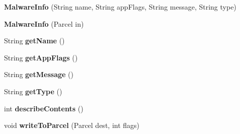 \begin{DoxyCompactItemize}
\item 
\hypertarget{classcom_1_1avira_1_1antivirusimplementation_1_1_malware_info_af6edd31deb26cc1c5a344ef0303b65dd}{}{\bfseries Malware\+Info} (String name, String app\+Flags, String message, String type)\label{classcom_1_1avira_1_1antivirusimplementation_1_1_malware_info_af6edd31deb26cc1c5a344ef0303b65dd}

\item 
\hypertarget{classcom_1_1avira_1_1antivirusimplementation_1_1_malware_info_acb2686626b6412ed2055b8b3dc4f8a12}{}{\bfseries Malware\+Info} (Parcel in)\label{classcom_1_1avira_1_1antivirusimplementation_1_1_malware_info_acb2686626b6412ed2055b8b3dc4f8a12}

\item 
\hypertarget{classcom_1_1avira_1_1antivirusimplementation_1_1_malware_info_aaea00237b4d2953ea9418ea1cae627f5}{}String {\bfseries get\+Name} ()\label{classcom_1_1avira_1_1antivirusimplementation_1_1_malware_info_aaea00237b4d2953ea9418ea1cae627f5}

\item 
\hypertarget{classcom_1_1avira_1_1antivirusimplementation_1_1_malware_info_acb9291551c3240c35c635192bd772590}{}String {\bfseries get\+App\+Flags} ()\label{classcom_1_1avira_1_1antivirusimplementation_1_1_malware_info_acb9291551c3240c35c635192bd772590}

\item 
\hypertarget{classcom_1_1avira_1_1antivirusimplementation_1_1_malware_info_a770a87cd5c333d45f26a4e1bc30a5861}{}String {\bfseries get\+Message} ()\label{classcom_1_1avira_1_1antivirusimplementation_1_1_malware_info_a770a87cd5c333d45f26a4e1bc30a5861}

\item 
\hypertarget{classcom_1_1avira_1_1antivirusimplementation_1_1_malware_info_a324dbd7f3a3985f57e3ee39fabe735e9}{}String {\bfseries get\+Type} ()\label{classcom_1_1avira_1_1antivirusimplementation_1_1_malware_info_a324dbd7f3a3985f57e3ee39fabe735e9}

\item 
\hypertarget{classcom_1_1avira_1_1antivirusimplementation_1_1_malware_info_a77e71b13d1f688d49e9d183f2cf6c166}{}int {\bfseries describe\+Contents} ()\label{classcom_1_1avira_1_1antivirusimplementation_1_1_malware_info_a77e71b13d1f688d49e9d183f2cf6c166}

\item 
\hypertarget{classcom_1_1avira_1_1antivirusimplementation_1_1_malware_info_a772bb2b1d0691160be80f71a08e9e448}{}void {\bfseries write\+To\+Parcel} (Parcel dest, int flags)\label{classcom_1_1avira_1_1antivirusimplementation_1_1_malware_info_a772bb2b1d0691160be80f71a08e9e448}

\end{DoxyCompactItemize}

